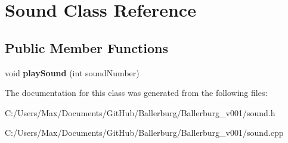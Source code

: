 \section{Sound Class Reference}
\label{class_sound}
\subsection*{Public Member Functions}
\begin{DoxyCompactItemize}
\item 
void {\bfseries play\+Sound} (int sound\+Number)\label{class_sound_a24976b9227b585221a17e536c2e15679}

\end{DoxyCompactItemize}


The documentation for this class was generated from the following files\+:\begin{DoxyCompactItemize}
\item 
C\+:/\+Users/\+Max/\+Documents/\+Git\+Hub/\+Ballerburg/\+Ballerburg\+\_\+v001/sound.\+h\item 
C\+:/\+Users/\+Max/\+Documents/\+Git\+Hub/\+Ballerburg/\+Ballerburg\+\_\+v001/sound.\+cpp\end{DoxyCompactItemize}
